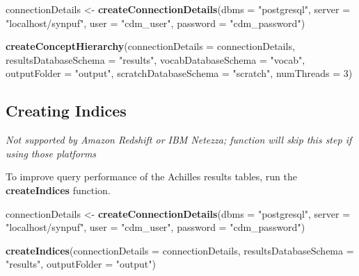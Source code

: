 \documentclass[]{article}
\newenvironment{Shaded}{\begin{snugshade}}{\end{snugshade}}
\newcommand{\KeywordTok}[1]{\textcolor[rgb]{0.13,0.29,0.53}{\textbf{#1}}}
\newcommand{\DataTypeTok}[1]{\textcolor[rgb]{0.13,0.29,0.53}{#1}}
\newcommand{\DecValTok}[1]{\textcolor[rgb]{0.00,0.00,0.81}{#1}}
\newcommand{\StringTok}[1]{\textcolor[rgb]{0.31,0.60,0.02}{#1}}
\newcommand{\NormalTok}[1]{#1}
\begin{document}
\begin{Shaded}
\begin{Highlighting}[]
\NormalTok{connectionDetails <-}\StringTok{ }\KeywordTok{createConnectionDetails}\NormalTok{(}\DataTypeTok{dbms =} \StringTok{"postgresql"}\NormalTok{, }
                                             \DataTypeTok{server =} \StringTok{"localhost/synpuf"}\NormalTok{, }
                                             \DataTypeTok{user =} \StringTok{"cdm_user"}\NormalTok{, }
                                             \DataTypeTok{password =} \StringTok{"cdm_password"}\NormalTok{)}

\KeywordTok{createConceptHierarchy}\NormalTok{(}\DataTypeTok{connectionDetails =}\NormalTok{ connectionDetails, }
                       \DataTypeTok{resultsDatabaseSchema =} \StringTok{"results"}\NormalTok{, }
                       \DataTypeTok{vocabDatabaseSchema =} \StringTok{"vocab"}\NormalTok{, }
                       \DataTypeTok{outputFolder =} \StringTok{"output"}\NormalTok{, }
                       \DataTypeTok{scratchDatabaseSchema =} \StringTok{"scratch"}\NormalTok{, }
                       \DataTypeTok{numThreads =} \DecValTok{3}\NormalTok{)}
\end{Highlighting}
\end{Shaded}

\subsection{Creating Indices}\label{creating-indices}

\emph{Not supported by Amazon Redshift or IBM Netezza; function will
skip this step if using those platforms}

To improve query performance of the Achilles results tables, run the
\textbf{createIndices} function.

\begin{Shaded}
\begin{Highlighting}[]
\NormalTok{connectionDetails <-}\StringTok{ }\KeywordTok{createConnectionDetails}\NormalTok{(}\DataTypeTok{dbms =} \StringTok{"postgresql"}\NormalTok{, }
                                             \DataTypeTok{server =} \StringTok{"localhost/synpuf"}\NormalTok{, }
                                             \DataTypeTok{user =} \StringTok{"cdm_user"}\NormalTok{, }
                                             \DataTypeTok{password =} \StringTok{"cdm_password"}\NormalTok{)}

\KeywordTok{createIndices}\NormalTok{(}\DataTypeTok{connectionDetails =}\NormalTok{ connectionDetails, }
              \DataTypeTok{resultsDatabaseSchema =} \StringTok{"results"}\NormalTok{, }
              \DataTypeTok{outputFolder =} \StringTok{"output"}\NormalTok{)}
\end{Highlighting}
\end{Shaded}
\end{document}
